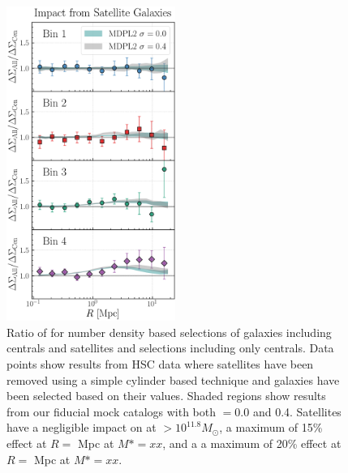\documentclass[fleqn,usenatbib,useAMS,english]{mnras}
\begin{document}
  \begin{figure}
      \centering
      \includegraphics[width=0.49\textwidth]{figure/dsigma_sat_ratio}
      \caption{
          Ratio of \dsigma{} for number density based selections of galaxies including centrals
          and satellites and selections including only centrals. Data points show results from
          HSC data where satellites have been removed using a simple cylinder based technique and
          galaxies have been selected based on their \mmax{} values. Shaded regions show results
          from our fiducial mock catalogs with both \sigmh{}$=0.0$ and 0.4. Satellites have a
          negligible impact on \dsigma{} at \mstar{}$> 10^{11.8} M_{\odot}$, a maximum of 15\%
          effect at $R=$ Mpc at $M*=xx$, and a a maximum of 20\% effect at $R=$
          Mpc at $M*=xx$.
          }
      \label{fig:satellite}
  \end{figure}

\end{document}
